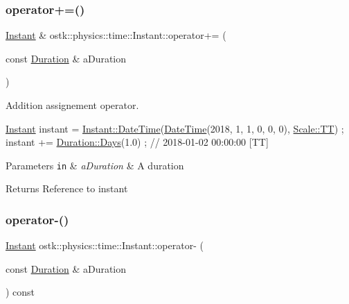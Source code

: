 \subsubsection{\texorpdfstring{operator+=()}{operator+=()}}
{\footnotesize\ttfamily \hyperlink{classostk_1_1physics_1_1time_1_1_instant}{Instant} \& ostk\+::physics\+::time\+::\+Instant\+::operator+= (\begin{DoxyParamCaption}\item[{const \hyperlink{classostk_1_1physics_1_1time_1_1_duration}{Duration} \&}]{a\+Duration }\end{DoxyParamCaption})}



Addition assignement operator. 


\begin{DoxyCode}
\hyperlink{classostk_1_1physics_1_1time_1_1_instant_a132c1e4b2fe9a9a671109206e297bd5d}{Instant} instant = \hyperlink{classostk_1_1physics_1_1time_1_1_instant_afd5725574a02389b80fad4baff313c8a}{Instant::DateTime}(\hyperlink{classostk_1_1physics_1_1time_1_1_instant_afd5725574a02389b80fad4baff313c8a}{DateTime}(2018, 1, 1, 0, 0, 0), 
      \hyperlink{namespaceostk_1_1physics_1_1time_adf23d37bd8641fb76a0e98ab46a70df7adf1f3edb9115acb0a1e04209b7a9937b}{Scale::TT}) ;
instant += \hyperlink{classostk_1_1physics_1_1time_1_1_duration_aefb4abc87c6957d00650228d069fa1e1}{Duration::Days}(1.0) ; \textcolor{comment}{// 2018-01-02 00:00:00 [TT]}
\end{DoxyCode}



\begin{DoxyParams}[1]{Parameters}
\mbox{\tt in}  & {\em a\+Duration} & A duration \\
\hline
\end{DoxyParams}
\begin{DoxyReturn}{Returns}
Reference to instant 
\end{DoxyReturn}
\mbox{\label{classostk_1_1physics_1_1time_1_1_instant_acda8b20c4ab0c89b717cf11d750767bc}} 
\subsubsection{\texorpdfstring{operator-\/()}{operator-()}\hspace{0.1cm}{\footnotesize\ttfamily [1/2]}}
{\footnotesize\ttfamily \hyperlink{classostk_1_1physics_1_1time_1_1_instant}{Instant} ostk\+::physics\+::time\+::\+Instant\+::operator-\/ (\begin{DoxyParamCaption}\item[{const \hyperlink{classostk_1_1physics_1_1time_1_1_duration}{Duration} \&}]{a\+Duration }\end{DoxyParamCaption}) const}



